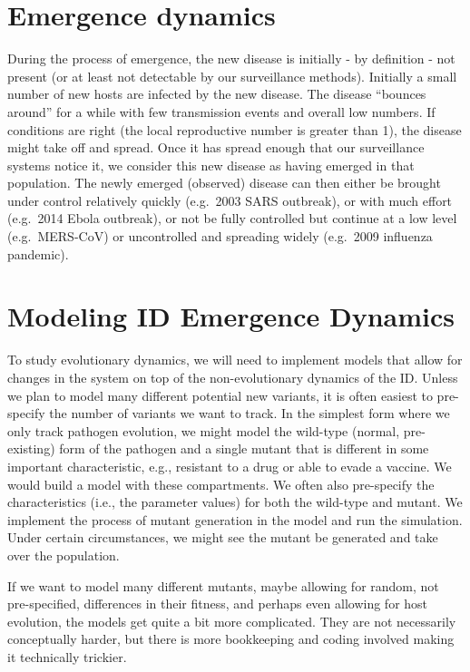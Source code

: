 \documentclass[
]{book}
\begin{document}
\hypertarget{emergence-dynamics}{%
\section{Emergence dynamics}\label{emergence-dynamics}}

During the process of emergence, the new disease is initially - by definition - not present (or at least not detectable by our surveillance methods). Initially a small number of new hosts are infected by the new disease. The disease ``bounces around'' for a while with few transmission events and overall low numbers. If conditions are right (the local reproductive number is greater than 1), the disease might take off and spread. Once it has spread enough that our surveillance systems notice it, we consider this new disease as having emerged in that population. The newly emerged (observed) disease can then either be brought under control relatively quickly (e.g.~2003 SARS outbreak), or with much effort (e.g.~2014 Ebola outbreak), or not be fully controlled but continue at a low level (e.g.~MERS-CoV) or uncontrolled and spreading widely (e.g.~2009 influenza pandemic).

\hypertarget{modeling-id-emergence-dynamics}{%
\section{Modeling ID Emergence Dynamics}\label{modeling-id-emergence-dynamics}}

To study evolutionary dynamics, we will need to implement models that allow for changes in the system on top of the non-evolutionary dynamics of the ID. Unless we plan to model many different potential new variants, it is often easiest to pre-specify the number of variants we want to track. In the simplest form where we only track pathogen evolution, we might model the wild-type (normal, pre-existing) form of the pathogen and a single mutant that is different in some important characteristic, e.g., resistant to a drug or able to evade a vaccine. We would build a model with these compartments. We often also pre-specify the characteristics (i.e., the parameter values) for both the wild-type and mutant. We implement the process of mutant generation in the model and run the simulation. Under certain circumstances, we might see the mutant be generated and take over the population.

If we want to model many different mutants, maybe allowing for random, not pre-specified, differences in their fitness, and perhaps even allowing for host evolution, the models get quite a bit more complicated. They are not necessarily conceptually harder, but there is more bookkeeping and coding involved making it technically trickier.
\end{document}
